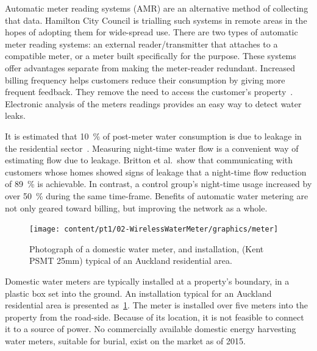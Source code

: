   Automatic meter reading systems (AMR) are an alternative method of collecting that data.
  Hamilton City Council is trialling such systems in remote areas in the hopes of adopting them for wide-spread use.
  There are two types of automatic meter reading systems:
  an external reader/transmitter that attaches to a compatible meter, or a meter built specifically for the purpose.
  These systems offer advantages separate from making the meter-reader redundant.
  Increased billing frequency helps customers reduce their consumption by giving more frequent feedback.
  They remove the need to access the customer's property~\cite{Chang2012}.
  Electronic analysis of the meters readings provides an easy way to detect water leaks.

  It is estimated that \SI{10}{\percent} of post-meter water consumption is due to leakage in the residential sector~\cite{Britton2013}.
  Measuring night-time water flow is a convenient way of estimating flow due to leakage.
  Britton et al.\ show that communicating with customers whose homes showed signs of leakage that a night-time flow reduction of \SI{89}{\percent} is achievable.
  In contrast, a control group's night-time usage increased by over \SI{50}{\percent} during the same time-frame.
  Benefits of automatic water metering are not only geared toward billing, but improving the network as a whole.

  \begin{figure}
    \centering
    \texttt{[image: content/pt1/02-WirelessWaterMeter/graphics/meter]}
    \caption{\label{fig:Photo_DomesticWaterMeter}Photograph of a domestic water meter, and installation, (Kent PSMT 25mm) typical of an Auckland residential area.}
  \end{figure}
  Domestic water meters are typically installed at a property's boundary, in a plastic box set into the ground.
  An installation typical for an Auckland residential area is presented as~\cref{fig:Photo_DomesticWaterMeter}.
  The meter is installed over five meters into the property from the road-side.
  Because of its location, it is not feasible to connect it to a source of power.
  No commercially available domestic energy harvesting water meters, suitable for burial, exist on the market as of 2015.

